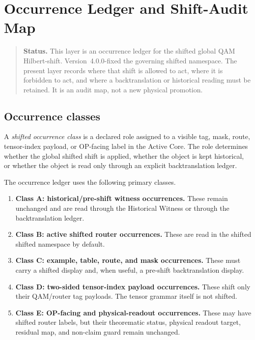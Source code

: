 \clearpage
\section{Occurrence Ledger and Shift-Audit Map}
\label{sec:v400-r02-occurrence-ledger-shift-audit-map}

\begin{quote}\small
\noindent\textbf{Status.}
This layer is an occurrence ledger for the shifted global QAM Hilbert-shift.
Version~4.0.0-fixed the governing shifted namespace. The present layer
records where that shift is allowed to act, where it is forbidden to act, and
where a backtranslation or historical reading must be retained. It is an audit
map, not a new physical promotion.
\end{quote}

\subsection{Occurrence classes}
\label{subsec:v400-r02-occurrence-classes}

\begin{definition}
\label{def:v400-r02-occurrence-class}
A \emph{shifted occurrence class} is a declared role assigned to a visible tag,
mask, route, tensor-index payload, or OP-facing label in the Active Core. The
role determines whether the global shifted shift is applied, whether the object is
kept historical, or whether the object is read only through an explicit
backtranslation ledger.
\end{definition}

\begin{definition}
\label{def:v400-r02-five-primary-occurrence-classes}
The occurrence ledger uses the following primary classes.
\begin{enumerate}[leftmargin=*]
 \item \textbf{Class A: historical/pre-shift witness occurrences.}
 These remain unchanged and are read through the Historical Witness or through
 the backtranslation ledger.

 \item \textbf{Class B: active shifted router occurrences.}
 These are read in the shifted shifted namespace by default.

 \item \textbf{Class C: example, table, route, and mask occurrences.}
 These must carry a shifted display and, when useful, a pre-shift backtranslation
 display.

 \item \textbf{Class D: two-sided tensor-index payload occurrences.}
 These shift only their QAM/router tag payloads. The tensor grammar itself is
 not shifted.

 \item \textbf{Class E: OP-facing and physical-readout occurrences.}
 These may have shifted router labels, but their theorematic status, physical
 readout target, residual map, and non-claim guard remain unchanged.
\end{enumerate}
\end{definition}


